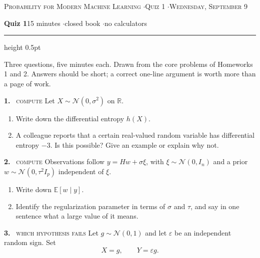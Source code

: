 \documentclass[11pt]{article}
\newcommand{\R}{\mathbb{R}}
\newcommand{\E}{\mathbb{E}}
\newcommand{\Nor}{\mathcal{N}}
\begin{document}
{\footnotesize\color{acc}\textsc{Probability for Modern Machine Learning \quad$\cdot$\quad Quiz 1 \quad$\cdot$\quad Wednesday, September 9}}

\vspace{0.4em}
{\large\bfseries Quiz 1}\hfill {\color{grey}15 minutes \quad$\cdot$\quad closed book \quad$\cdot$\quad no calculators}

\vspace{0.5em}
\hrule height 0.5pt
\vspace{0.3em}

{\footnotesize\color{grey} Three questions, five minutes each. Drawn from the core problems of Homeworks 1 and 2. Answers should be short; a correct one-line argument is worth more than a page of work.}

\vspace{1.4em}

\textbf{1.} \ \textsc{\small compute} \quad Let $X\sim\Nor(0,\sigma^2)$ on $\R$.

\begin{enumerate}[label=(\alph*),leftmargin=1.8em,itemsep=0.35em,topsep=0.35em]
\item Write down the differential entropy $h(X)$.
\item A colleague reports that a certain real-valued random variable has differential entropy $-3$. Is this possible? Give an example or explain why not.
\end{enumerate}

\vspace{1.8em}

\textbf{2.} \ \textsc{\small compute} \quad Observations follow $y=Hw+\sigma\xi$, with $\xi\sim\Nor(0,I_n)$ and a prior $w\sim\Nor(0,\tau^2I_p)$ independent of $\xi$.

\begin{enumerate}[label=(\alph*),leftmargin=1.8em,itemsep=0.35em,topsep=0.35em]
\item Write down $\E[w\mid y]$.
\item Identify the regularization parameter in terms of $\sigma$ and $\tau$, and say in one sentence what a large value of it means.
\end{enumerate}

\vspace{1.8em}

\textbf{3.} \ \textsc{\small which hypothesis fails} \quad Let $g\sim\Nor(0,1)$ and let $\varepsilon$ be an independent random sign. Set
\[
X=g,\qquad Y=\varepsilon g .
\]
\end{document}
